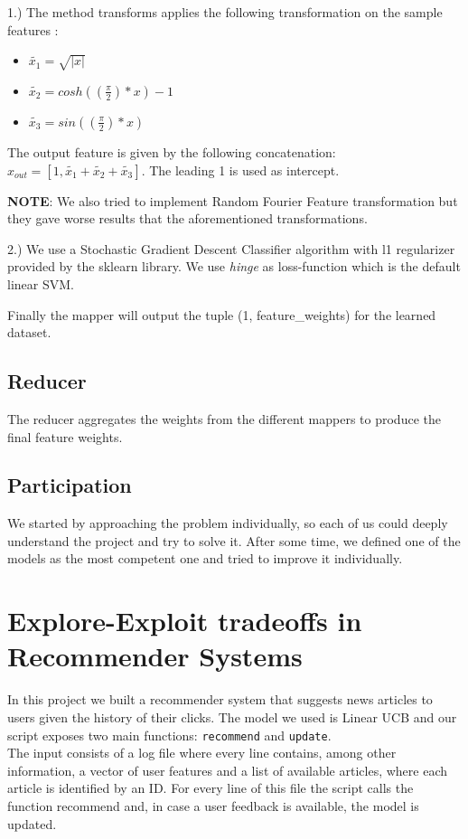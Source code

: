\documentclass[a4paper, 11pt]{article}
\begin{document}
1.) The method transforms applies the following transformation on the sample features :
\begin{itemize}
\item $\widetilde{x_1} = \sqrt{|x|}$
\item $\widetilde{x_2} = cosh((\frac{\pi}{2})*x) - 1$
\item $\widetilde{x_3} = sin((\frac{\pi}{2})*x)$
\end{itemize}
The output feature is given by the following concatenation: $x_{out} = [1, \widetilde{x_1} + \widetilde{x_2} + \widetilde{x_3}]$. The leading 1 is used as intercept.

\textbf{NOTE}: We also tried to implement Random Fourier Feature transformation but they gave worse results that the aforementioned transformations.

2.) We use a Stochastic Gradient Descent Classifier algorithm with l1 regularizer provided by the sklearn library. We use \textit{hinge} as loss-function which is the default linear SVM.

Finally the mapper will output the tuple (1, feature\_weights) for the learned dataset.

\subsection{Reducer}

The reducer aggregates the weights from the different mappers to produce the final feature weights.

\subsection{Participation}

We started by approaching the problem individually, so each of us could deeply understand the project and try to solve it. After some time, we defined one of the models as the most competent one and tried to improve it individually.






\newpage
\section{Explore-Exploit tradeoffs in Recommender Systems} 
In this project we built a recommender system that suggests news articles to users given the history of their clicks. 
The model we used is Linear UCB and our script exposes two main functions: \verb!recommend! and \verb!update!. \\
The input consists of a log file where every line contains, among other information, a vector of user features and a list of available articles, where each article is identified by an ID. For every line of this file the script calls the function recommend and, in case a user feedback is available, the model is updated.
\end{document}

